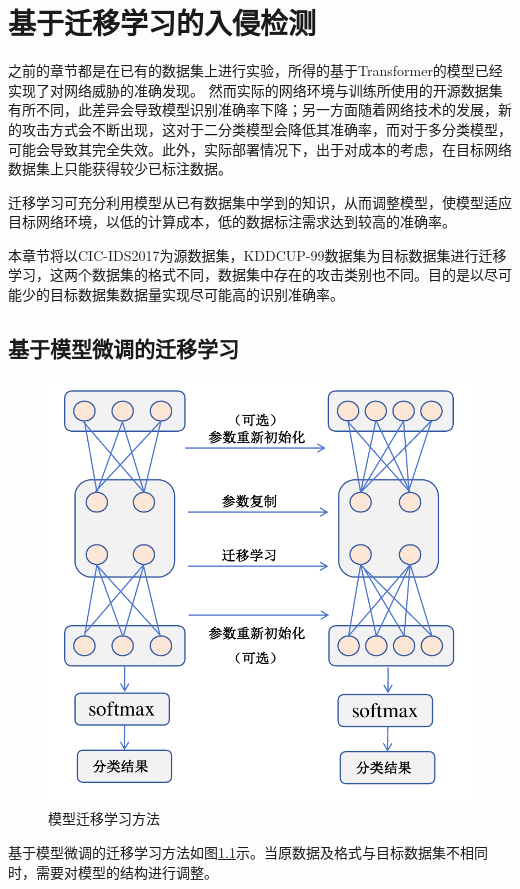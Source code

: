 \chapter{基于迁移学习的入侵检测}
之前的章节都是在已有的数据集上进行实验，所得的基于Transformer的模型已经实现了对网络威胁的准确发现。
然而实际的网络环境与训练所使用的开源数据集有所不同，此差异会导致模型识别准确率下降；另一方面随着网络技术的发展，新的攻击方式会不断出现，这对于二分类模型会降低其准确率，而对于多分类模型，可能会导致其完全失效。此外，实际部署情况下，出于对成本的考虑，在目标网络数据集上只能获得较少已标注数据。

迁移学习可充分利用模型从已有数据集中学到的知识，从而调整模型，使模型适应目标网络环境，以低的计算成本，低的数据标注需求达到较高的准确率。

本章节将以CIC-IDS2017为源数据集，KDDCUP-99数据集为目标数据集进行迁移学习，这两个数据集的格式不同，数据集中存在的攻击类别也不同。目的是以尽可能少的目标数据集数据量实现尽可能高的识别准确率。

\section{基于模型微调的迁移学习}
\begin{figure}
    \centering
    \includegraphics[height=.25\textheight,keepaspectratio]{img/transfer/model_transfer.pdf}
    \caption{模型迁移学习方法}
    \label{fig:model_transfer}
\end{figure}
基于模型微调的迁移学习方法如图\ref{fig:model_transfer}示。当原数据及格式与目标数据集不相同时，需要对模型的结构进行调整。

